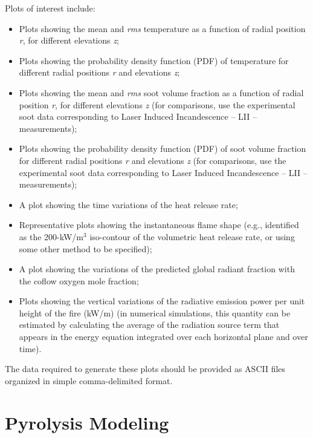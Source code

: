 \documentclass[12pt]{article}
\begin{document}
\newpage
Plots of interest include:
\begin{itemize}[noitemsep]
\item Plots showing the mean and {\it rms} temperature as a function of radial position {\it r}, for different elevations {\it z};
\item Plots showing the probability density function (PDF) of temperature for different radial positions {\it r} and elevations {\it z};
\item Plots showing the mean and {\it rms} soot volume fraction as a function of radial position {\it r}, for different elevations {\it z} (for comparisons, use the experimental soot data corresponding to Laser Induced Incandescence -- LII -- measurements); 
\item Plots showing the probability density function (PDF) of soot volume fraction for different radial positions {\it r} and elevations {\it z} (for comparisons, use the experimental soot data corresponding to Laser Induced Incandescence -- LII -- measurements);
\item A plot showing the time variations of the heat release rate;
\item Representative plots showing the instantaneous flame shape (e.g., identified as the 200-kW/m$^3$ iso-contour of the volumetric heat release rate, or using some other method to be specified);
\item A plot showing the variations of the predicted global radiant fraction with the coflow oxygen mole fraction;
\item Plots showing the vertical variations of the radiative emission power per unit height of the fire (kW/m) (in numerical simulations, this quantity can be estimated by calculating the average of the radiation source term that appears in the energy equation integrated over each horizontal plane and over time).
 \end{itemize}
 
 The data required to generate these plots should be provided as ASCII files organized in simple comma-delimited format.


\clearpage
\section{Pyrolysis Modeling}
\label{Sec:Pyrolysis}
\end{document}

